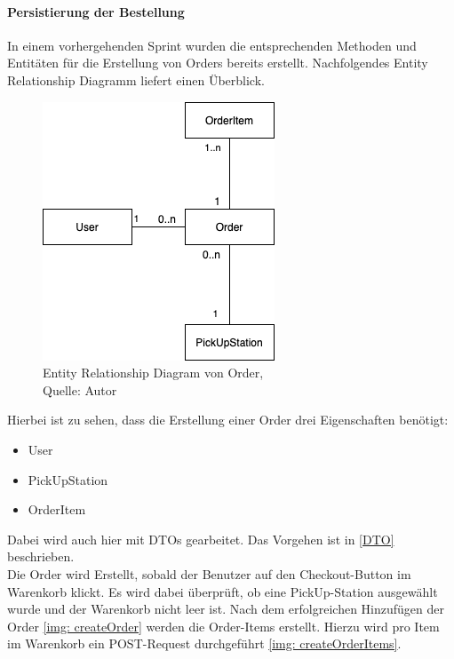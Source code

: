 \paragraph{Persistierung der Bestellung}
In einem vorhergehenden Sprint wurden die entsprechenden Methoden und Entitäten für die Erstellung von Orders bereits erstellt. Nachfolgendes Entity Relationship Diagramm liefert einen Überblick. 
 \begin{figure}[H]
	\centering
	\includegraphics[scale=0.5]{images/erdOrder.PNG}
	\caption[Entity Relationship Diagram von Order]{Entity Relationship Diagram von Order,\\ Quelle: Autor}
	\label{img: erdOrder}
\end{figure} 
Hierbei ist zu sehen, dass die Erstellung einer Order drei Eigenschaften benötigt: 
\begin{itemize}
	\item User
	\item PickUpStation
	\item OrderItem
\end{itemize}
Dabei wird auch hier mit DTOs gearbeitet. Das Vorgehen ist in \ref{DTO} beschrieben. \\
Die Order wird Erstellt, sobald der Benutzer auf den Checkout-Button im Warenkorb klickt. Es wird dabei überprüft, ob eine PickUp-Station ausgewählt wurde und der Warenkorb nicht leer ist. Nach dem erfolgreichen Hinzufügen der Order \ref{img: createOrder} werden die Order-Items erstellt. Hierzu wird pro Item im Warenkorb ein POST-Request durchgeführt \ref{img: createOrderItems}. 

